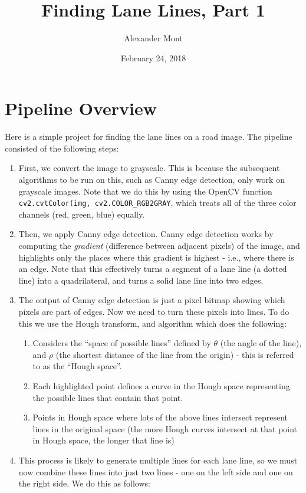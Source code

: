 \documentclass{article}
\date{February 24, 2018}
\begin{document}
\title{Finding Lane Lines, Part 1}
\author{Alexander Mont}
\maketitle
\section{Pipeline Overview}

Here is a simple project for finding the lane lines on a road image. The pipeline consisted of the following steps:

\begin{enumerate}
\item First, we convert the image to grayscale. This is because the subsequent algorithms to be run on this, such as Canny edge detection, only work on grayscale images. Note that we do this by using the OpenCV function \texttt{cv2.cvtColor(img, cv2.COLOR\_RGB2GRAY}, which treats all of the three color channels (red, green, blue) equally.
\item Then, we apply Canny edge detection. Canny edge detection works by computing the \emph{gradient} (difference between adjacent pixels) of the image, and highlights only the places where this gradient is highest - i.e., where there is an edge. Note that this effectively turns a segment of a lane line (a dotted line) into a quadrilateral, and turns a solid lane line into two edges.
\item The output of Canny edge detection is just a pixel bitmap showing which pixels are part of edges. Now we need to turn these pixels into lines. To do this we use the Hough transform, and algorithm which does the following:
\begin{enumerate}
\item Considers the ``space of possible lines'' defined by $\theta$ (the angle of the line), and $\rho$ (the shortest distance of the line from the origin) - this is referred to as the ``Hough space''.
\item Each highlighted point defines a curve in the Hough space representing the possible lines that contain that point.
\item Points in Hough space where lots of the above lines intersect represent lines in the original space (the more Hough curves intersect at that point in Hough space, the longer that line is)
\end{enumerate}
\item This process is likely to generate multiple lines for each lane line, so we must now combine these lines into just two lines - one on the left side and one on the right side. We do this as follows:

\end{enumerate}
\end{document}
